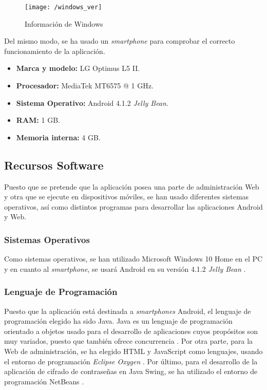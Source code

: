 \begin{figure}[!h]
	\begin{center}
		\texttt{[image: /windows\_ver]}
		\caption{Información de Windows}
		\label{fig:winver}
	\end{center}
\end{figure}

Del mismo modo, se ha usado un \textit{smartphone} para comprobar el correcto funcionamiento de la aplicación.

\begin{itemize}
	\item \textbf{Marca y modelo:} LG Optimus L5 II.
	\item \textbf{Procesador:} MediaTek MT6575 @ 1 \acs{GHz}.
	\item \textbf{Sistema Operativo:} Android 4.1.2 \textit{Jelly Bean}.
	\item \textbf{RAM:} 1 \acs{GB}.
	\item \textbf{Memoria interna:} 4 \acs{GB}.
\end{itemize}

\clearpage

\subsection{Recursos Software}
Puesto que se pretende que la aplicación posea una parte de administración Web y otra que se ejecute en dispositivos móviles, se han usado diferentes sistemas operativos, así como distintos programas para desarrollar las aplicaciones Android y Web.

\subsubsection*{Sistemas Operativos}
Como sistemas operativos, se han utilizado Microsoft Windows 10 Home \cite{Microsoft} en el PC y en cuanto al \textit{smartphone}, se usará Android en su versión 4.1.2 \textit{Jelly Bean} \cite{Andro}.

\subsubsection*{Lenguaje de Programación}
Puesto que la aplicación está destinada a \textit{smartphones} Android, el lenguaje de programación elegido ha sido Java. Java es un lenguaje de programación orientado a objetos usado para el desarrollo de aplicaciones cuyos propósitos son muy variados, puesto que también ofrece concurrencia \cite{Java}. Por otra parte, para la Web de administración, se ha elegido HTML y JavaScript como lenguajes, usando el entorno de programación \textit{Eclipse Oxygen} \cite{EclipseFoundation2018}. Por último, para el desarrollo de la aplicación de cifrado de contraseñas en Java Swing, se ha utilizado el entorno de programación NetBeans \cite{NetBeans2018}.

